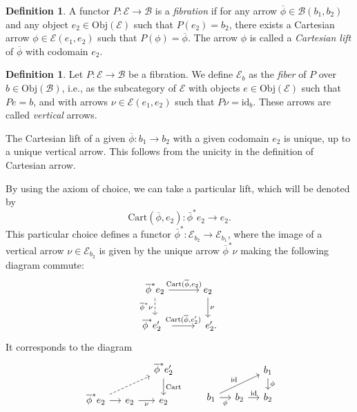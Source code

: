 \documentclass[12pt,reqno]{amsart}
\theoremstyle{definition}
\newtheorem{defi}[teo]{Definition}
\theoremstyle{remark}
\numberwithin{figure}{section}%
\newcommand{\Ba}{\mathcal{B}}
\newcommand{\bbar}{\overline}
\newcommand{\Cart}{\mathrm{Cart}}
\newcommand{\E}{\mathcal{E}}
\newcommand{\id}{\mathrm{id}}
\begin{document}
\begin{defi}A functor $P\colon \E \to \Ba$ is a {\em fibration} if for any arrow $\bbar\phi\in \Ba(b_1,b_2)$ and any object $e_2\in\mathrm{Obj}(\E)$ such that $P(e_2)=b_2$, there exists a Cartesian arrow $\phi\in \E(e_1,e_2)$ such that $P(\phi)=\bbar\phi$. The arrow $\phi$ is called a {\em Cartesian lift} of $\bbar\phi$ with codomain $e_2$.
\end{defi}



\begin{defi}
Let $P\colon \E \to \Ba$ be a fibration. We define $\E_b$ as the {\em fiber} of $P$ over $b\in\mathrm{Obj}(\Ba)$, i.e., as the subcategory of $\E$ with objects $e\in \mathrm{Obj}(\E)$  such that $Pe=b$, and with arrows 
$\nu\in \E(e_1,e_2)$ such that $P\nu=\id_b$. These arrows are called {\em vertical} arrows.
\end{defi}


The Cartesian lift of a given $\bbar\phi\colon b_1 \to b_2$ with a given codomain $e_2$ is unique, up to a unique vertical arrow. This follows from the unicity in the definition of Cartesian arrow.

By using the axiom of choice, we can take a particular lift, which will be denoted by
$$\Cart(\bbar\phi, e_2)\colon \bar\phi^*e_2 \to e_2.$$
This particular choice defines a functor ${\bar\phi}^*\colon \E_{b_2} \to \E_{b_1}$, where the image  of a vertical arrow $\nu\in \E_{b_2}$ is given by the unique arrow ${\bbar\phi}^*\nu$ making the following diagram commute:
$$\begin{tikzcd}%
\bbar\phi^*e_2\arrow[d,"{\bbar\phi^*\nu}"',dashed]\arrow[r,"{\Cart(\bbar\phi, e_2)}"]&e_2\arrow[d,"\nu"]\\
\bbar\phi^*e_2'\ \ \arrow[r,"{\Cart(\bbar\phi, e_2')}"]&\ \ e_2'.
\end{tikzcd}
$$
It corresponds to the diagram
$$
\begin{tikzcd}[column sep=12pt, row sep=12pt] 
&& {\bbar\phi}^*e_2' \ar{d}{\Cart} \\
{\bbar\phi}^*e_2\arrow[rru,dashrightarrow] \arrow[r] &e_2\arrow[r,"\nu"']& e_2 
\end{tikzcd}
\quad \quad
 \begin{tikzcd}[column sep=12pt, row sep=12pt] 
&& b_1 \arrow[d,"\phi"] \\
b_1\arrow[urr,"{\id}"]\arrow[r,"\phi"'] &b_2\arrow[r,"\id"]& b_2
\end{tikzcd}
$$
%
\end{document}
